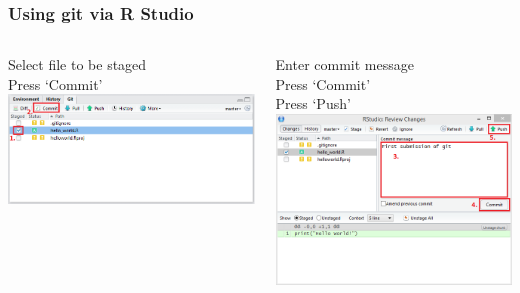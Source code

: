 \documentclass{beamer}\usepackage[]{graphicx}\usepackage[]{color}
\begin{document}
\begin{frame}
\frametitle{Using git via R Studio}
\begin{columns}[t]
\centering
\begin{block}{Select file to be staged \\ Press `Commit'}
\centering
\includegraphics[scale=0.32]{img/project/staging_git.png}
\end{block}
\centering
\begin{block}{Enter commit message \\ Press `Commit' \\ Press `Push'}
\centering
\includegraphics[scale=0.36]{img/project/commit_step_git.png}
\end{block}
\end{columns}

\end{frame}
\end{document}
